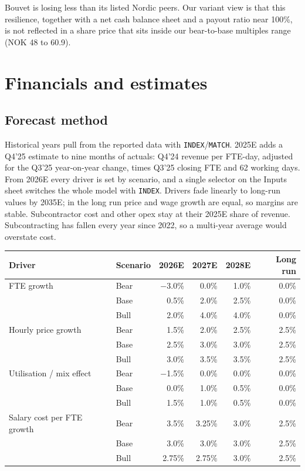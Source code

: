 \documentclass[10pt,a4paper]{article}
\begin{document}
Bouvet is losing less than its listed Nordic peers. Our variant view is that this resilience, together with a net cash balance sheet and a payout ratio near 100\%, is not reflected in a share price that sits inside our bear-to-base multiples range (NOK 48 to 60.9).

\section{Financials and estimates}
\subsection{Forecast method}
Historical years pull from the reported data with \texttt{INDEX}/\texttt{MATCH}. 2025E adds a Q4'25 estimate to nine months of actuals: Q4'24 revenue per FTE-day, adjusted for the Q3'25 year-on-year change, times Q3'25 closing FTE and 62 working days. From 2026E every driver is set by scenario, and a single selector on the Inputs sheet switches the whole model with \texttt{INDEX}. Drivers fade linearly to long-run values by 2035E; in the long run price and wage growth are equal, so margins are stable. Subcontractor cost and other opex stay at their 2025E share of revenue. Subcontracting has fallen every year since 2022, so a multi-year average would overstate cost.

\begin{center}
\small
\begin{tabularx}{\textwidth}{@{}llRRRR@{}}
\toprule
\textbf{Driver} & \textbf{Scenario} & \textbf{2026E} & \textbf{2027E} & \textbf{2028E} & \textbf{Long run} \\
\midrule
FTE growth & Bear & $-$3.0\% & 0.0\% & 1.0\% & 0.0\% \\
 & Base & 0.5\% & 2.0\% & 2.5\% & 0.0\% \\
 & Bull & 2.0\% & 4.0\% & 4.0\% & 0.0\% \\
\addlinespace[2pt]
Hourly price growth & Bear & 1.5\% & 2.0\% & 2.5\% & 2.5\% \\
 & Base & 2.5\% & 3.0\% & 3.0\% & 2.5\% \\
 & Bull & 3.0\% & 3.5\% & 3.5\% & 2.5\% \\
\addlinespace[2pt]
Utilisation / mix effect & Bear & $-$1.5\% & 0.0\% & 0.0\% & 0.0\% \\
 & Base & 0.0\% & 1.0\% & 0.5\% & 0.0\% \\
 & Bull & 1.5\% & 1.0\% & 0.5\% & 0.0\% \\
\addlinespace[2pt]
Salary cost per FTE growth & Bear & 3.5\% & 3.25\% & 3.0\% & 2.5\% \\
 & Base & 3.0\% & 3.0\% & 3.0\% & 2.5\% \\
 & Bull & 2.75\% & 2.75\% & 3.0\% & 2.5\% \\
\bottomrule
\end{tabularx}
\end{center}
\end{document}
